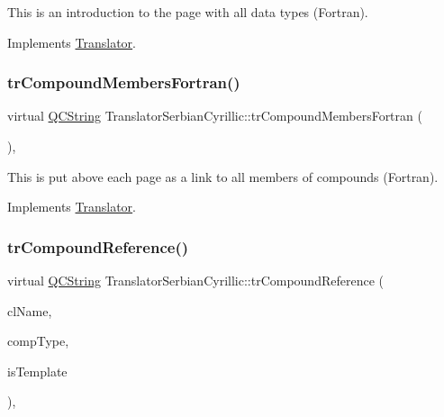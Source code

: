 This is an introduction to the page with all data types (Fortran). 

Implements \mbox{\hyperlink{class_translator}{Translator}}.

\mbox{\label{class_translator_serbian_cyrillic_a4f89810a951a24422c8b8709a65c0f5d}} 
\subsubsection{\texorpdfstring{trCompoundMembersFortran()}{trCompoundMembersFortran()}}
{\footnotesize\ttfamily virtual \mbox{\hyperlink{class_q_c_string}{Q\+C\+String}} Translator\+Serbian\+Cyrillic\+::tr\+Compound\+Members\+Fortran (\begin{DoxyParamCaption}{ }\end{DoxyParamCaption})\hspace{0.3cm}{\ttfamily [inline]}, {\ttfamily [virtual]}}

This is put above each page as a link to all members of compounds (Fortran). 

Implements \mbox{\hyperlink{class_translator}{Translator}}.

\mbox{\label{class_translator_serbian_cyrillic_a798d2b6dc09bed21a980947f3fc5676a}} 
\subsubsection{\texorpdfstring{trCompoundReference()}{trCompoundReference()}}
{\footnotesize\ttfamily virtual \mbox{\hyperlink{class_q_c_string}{Q\+C\+String}} Translator\+Serbian\+Cyrillic\+::tr\+Compound\+Reference (\begin{DoxyParamCaption}\item[{const char $\ast$}]{cl\+Name,  }\item[{\mbox{\hyperlink{class_class_def_ae70cf86d35fe954a94c566fbcfc87939}{Class\+Def\+::\+Compound\+Type}}}]{comp\+Type,  }\item[{bool}]{is\+Template }\end{DoxyParamCaption})\hspace{0.3cm}{\ttfamily [inline]}, {\ttfamily [virtual]}}

